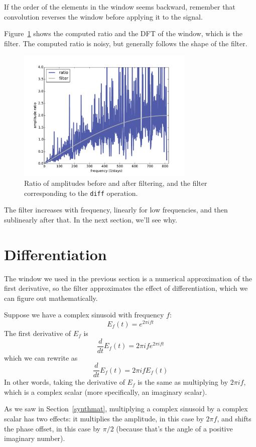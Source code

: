 \documentclass[12pt]{book}
\begin{document}
If the order of the elements in the window seems backward,
remember that convolution reverses the window before applying it
to the signal.

Figure~\ref{fig.systems3} shows the computed ratio and the DFT of the
window, which is the filter.  The computed ratio is noisy, but
generally follows the shape of the filter.

\begin{figure}
\centerline{\includegraphics[height=2.5in]{figs/systems3.pdf}}
\caption{Ratio of amplitudes before and after filtering, and
the filter corresponding to the {\tt diff} operation.}
\label{fig.systems3}
\end{figure}

The filter increases with frequency, linearly for low frequencies,
and then sublinearly after that.  In the next section, we'll see why.


\section{Differentiation}
\label{effdiff}

The window we used in the previous section is a
numerical approximation of the first derivative, so the filter
approximates the effect of differentiation, which we can
figure out mathematically.

Suppose we have a complex sinusoid with frequency $f$:
%
\[ E_f(t) = e^{2 \pi i f t} \]
%
The first derivative of $E_f$ is
%
\[ \frac{d}{dt} E_f(t) = 2 \pi i f e^{2 \pi i f t} \]
%
which we can rewrite as
%
\[ \frac{d}{dt} E_f(t) = 2 \pi i f E_f(t) \]
%
In other words, taking the derivative of $E_f$ is the same
as multiplying by $2 \pi i f$, which is a complex scalar
(more specifically, an imaginary scalar).

As we saw in Section~\ref{synthmat}, multiplying a complex sinusoid
by a complex scalar has two effects: it multiplies
the amplitude, in this case by $2 \pi f$, and shifts the phase
offset, in this case by $\pi/2$ (because that's the angle of
a positive imaginary number).
\end{document}
